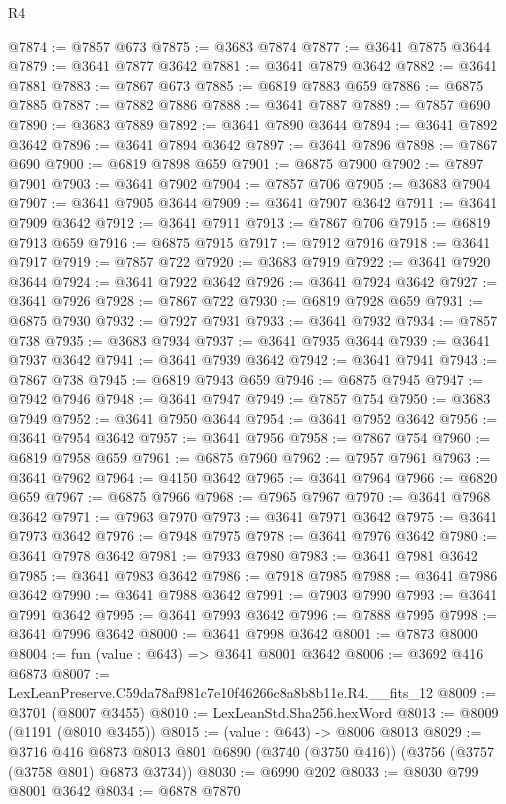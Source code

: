 \begin{lexlean}{R4}
\begin{coremodule}
@7874 := @7857 @673
@7875 := @3683 @7874
@7877 := @3641 @7875 @3644
@7879 := @3641 @7877 @3642
@7881 := @3641 @7879 @3642
@7882 := @3641 @7881
@7883 := @7867 @673
@7885 := @6819 @7883 @659
@7886 := @6875 @7885
@7887 := @7882 @7886
@7888 := @3641 @7887
@7889 := @7857 @690
@7890 := @3683 @7889
@7892 := @3641 @7890 @3644
@7894 := @3641 @7892 @3642
@7896 := @3641 @7894 @3642
@7897 := @3641 @7896
@7898 := @7867 @690
@7900 := @6819 @7898 @659
@7901 := @6875 @7900
@7902 := @7897 @7901
@7903 := @3641 @7902
@7904 := @7857 @706
@7905 := @3683 @7904
@7907 := @3641 @7905 @3644
@7909 := @3641 @7907 @3642
@7911 := @3641 @7909 @3642
@7912 := @3641 @7911
@7913 := @7867 @706
@7915 := @6819 @7913 @659
@7916 := @6875 @7915
@7917 := @7912 @7916
@7918 := @3641 @7917
@7919 := @7857 @722
@7920 := @3683 @7919
@7922 := @3641 @7920 @3644
@7924 := @3641 @7922 @3642
@7926 := @3641 @7924 @3642
@7927 := @3641 @7926
@7928 := @7867 @722
@7930 := @6819 @7928 @659
@7931 := @6875 @7930
@7932 := @7927 @7931
@7933 := @3641 @7932
@7934 := @7857 @738
@7935 := @3683 @7934
@7937 := @3641 @7935 @3644
@7939 := @3641 @7937 @3642
@7941 := @3641 @7939 @3642
@7942 := @3641 @7941
@7943 := @7867 @738
@7945 := @6819 @7943 @659
@7946 := @6875 @7945
@7947 := @7942 @7946
@7948 := @3641 @7947
@7949 := @7857 @754
@7950 := @3683 @7949
@7952 := @3641 @7950 @3644
@7954 := @3641 @7952 @3642
@7956 := @3641 @7954 @3642
@7957 := @3641 @7956
@7958 := @7867 @754
@7960 := @6819 @7958 @659
@7961 := @6875 @7960
@7962 := @7957 @7961
@7963 := @3641 @7962
@7964 := @4150 @3642
@7965 := @3641 @7964
@7966 := @6820 @659
@7967 := @6875 @7966
@7968 := @7965 @7967
@7970 := @3641 @7968 @3642
@7971 := @7963 @7970
@7973 := @3641 @7971 @3642
@7975 := @3641 @7973 @3642
@7976 := @7948 @7975
@7978 := @3641 @7976 @3642
@7980 := @3641 @7978 @3642
@7981 := @7933 @7980
@7983 := @3641 @7981 @3642
@7985 := @3641 @7983 @3642
@7986 := @7918 @7985
@7988 := @3641 @7986 @3642
@7990 := @3641 @7988 @3642
@7991 := @7903 @7990
@7993 := @3641 @7991 @3642
@7995 := @3641 @7993 @3642
@7996 := @7888 @7995
@7998 := @3641 @7996 @3642
@8000 := @3641 @7998 @3642
@8001 := @7873 @8000
@8004 := fun (value : @643) => @3641 @8001 @3642
@8006 := @3692 @416 @6873
@8007 := LexLeanPreserve.C59da78af981c7e10f46266c8a8b8b11e.R4.__fits_12
@8009 := @3701 (@8007 @3455)
@8010 := LexLeanStd.Sha256.hexWord
@8013 := @8009 (@1191 (@8010 @3455))
@8015 := (value : @643) -> @8006 @8013
@8029 := @3716
    @416
    @6873
    @8013
    @801
    @6890
    (@3740 (@3750 @416))
    (@3756 (@3757 (@3758 @801) @6873 @3734))
@8030 := @6990 @202
@8033 := @8030 @799 @8001 @3642
@8034 := @6878 @7870

\end{coremodule}
\end{lexlean}
